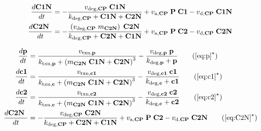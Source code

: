 \begin{table}[h]
\begin{minipage}{5in}
\begin{align}
      \frac{d\text{\bf C1N}}{dt}  & = - \frac{ v_{\text{deg,{\bf CP}}} \;\text{\bf C1N} }{k_{\text{deg,{\bf CP}}} +\text{\bf C1N}  + \text{\bf C2N} } + v_{\text{a,{\bf CP}}} \;\text{\bf P}  \;\text{\bf C1} - v_{\text{d,{\bf CP}}} \;\text{\bf C1N} \\
      \label{eq:C2N}
      \frac{d\text{\bf C2N }}{dt} & = - \frac{ \left(v_{\text{deg,{\bf CP}}} \; m_{\text{\bf C2N}}\right) \; \text{\bf C2N} }{k_{\text{deg,{\bf CP}}} + \text{\bf C2N}  +\text{\bf C1N} } + v_{\text{a,{\bf CP}}} \;\text{\bf P}  \;\text{\bf C2} - v_{\text{d,{\bf CP}}} \; \text{\bf C2N}
    \end{align}
  \end{minipage}
\end{table}


\begin{table}[h]
  \centering
  \begin{minipage}{5in}
    \label{tab:actfns}

    \begin{align*}
      \frac{d\text{\bf p}}{dt} &= \frac{v_{\text{txn,{\bf p}}}}{k_{\text{txn,{\bf p}}} + \left(m_{\text{\bf C2N}} \; \text{\bf C1N}  + \text{\bf C2N} \right)^3} - \frac{v_{\text{deg,{\bf p}}} \;\text{\bf p} }{k_{\text{deg,{\bf p}}} +\text{\bf p} } \tag{$\ref{eq:p}^{\star}$}\\
      \frac{d\text{\bf c1}}{dt} &= \frac{v_{\text{txn,{\bf c1}}}}{k_{\text{txn,{\bf c}}} + \left(m_{\text{\bf C2N}} \; \text{\bf C1N}  + \text{\bf C2N} \right)^3} - \frac{v_{\text{deg,{\bf c1}}} \;\text{\bf c1} }{k_{\text{deg,{\bf c}}} +\text{\bf c1} } \tag{$\ref{eq:c1}^{\star}$}\\
      \frac{d\text{\bf c2}}{dt} &= \frac{v_{\text{txn,{\bf c2}}}}{k_{\text{txn,{\bf c}}} + \left(m_{\text{\bf C2N}} \; \text{\bf C1N}  + \text{\bf C2N} \right)^3} - \frac{v_{\text{deg,{\bf c2}}} \;\text{\bf c2} }{k_{\text{deg,{\bf c}}} +\text{\bf c2} } \tag{$\ref{eq:c2}^{\star}$}\\
      \frac{d\text{\bf C2N }}{dt} &= - \frac{ v_{\text{deg,{\bf CP}}} \; \text{\bf C2N} }{k_{\text{deg,{\bf CP}}} + \text{\bf C2N}  +\text{\bf C1N} } + v_{\text{a,{\bf CP}}} \;\text{\bf P}  \;\text{\bf C2} - v_{\text{d,{\bf CP}}} \; \text{\bf C2N}
      \tag{$\ref{eq:C2N}^{\star}$}
    \end{align*}
  \end{minipage}
\end{table}


